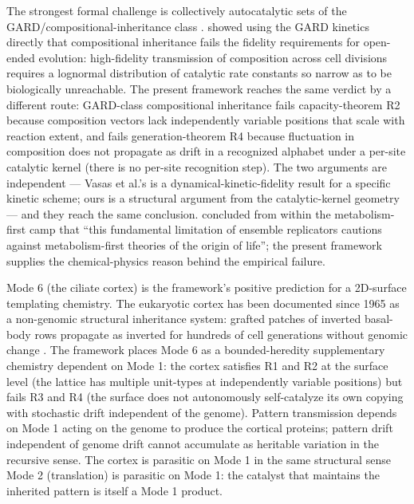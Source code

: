 \documentclass[aps,prx,reprint,amsmath,amssymb,floatfix,superscriptaddress,nofootinbib]{revtex4-2}
\theoremstyle{plain-thm}
\theoremstyle{definition-thm}
\begin{document}
The strongest formal challenge is collectively autocatalytic sets of the GARD/compositional-inheritance class \citep{Kauffman1986, Hordijk2012}. \citet{Vasas2010} showed using the GARD kinetics directly that compositional inheritance fails the fidelity requirements for open-ended evolution: high-fidelity transmission of composition across cell divisions requires a lognormal distribution of catalytic rate constants so narrow as to be biologically unreachable. The present framework reaches the same verdict by a different route: GARD-class compositional inheritance fails capacity-theorem R2 because composition vectors lack independently variable positions that scale with reaction extent, and fails generation-theorem R4 because fluctuation in composition does not propagate as drift in a recognized alphabet under a per-site catalytic kernel (there is no per-site recognition step). The two arguments are independent --- Vasas et al.'s is a dynamical-kinetic-fidelity result for a specific kinetic scheme; ours is a structural argument from the catalytic-kernel geometry --- and they reach the same conclusion. \citet{Vasas2010} concluded from within the metabolism-first camp that ``this fundamental limitation of ensemble replicators cautions against metabolism-first theories of the origin of life''; the present framework supplies the chemical-physics reason behind the empirical failure.

Mode 6 (the ciliate cortex) is the framework's positive prediction for a 2D-surface templating chemistry. The eukaryotic cortex has been documented since 1965 as a non-genomic structural inheritance system: grafted patches of inverted basal-body rows propagate as inverted for hundreds of cell generations without genomic change \citep{BeissonSonneborn1965, Frankel1989}. The framework places Mode 6 as a bounded-heredity supplementary chemistry dependent on Mode 1: the cortex satisfies R1 and R2 at the surface level (the lattice has multiple unit-types at independently variable positions) but fails R3 and R4 (the surface does not autonomously self-catalyze its own copying with stochastic drift independent of the genome). Pattern transmission depends on Mode 1 acting on the genome to produce the cortical proteins; pattern drift independent of genome drift cannot accumulate as heritable variation in the recursive sense. The cortex is parasitic on Mode 1 in the same structural sense Mode 2 (translation) is parasitic on Mode 1: the catalyst that maintains the inherited pattern is itself a Mode 1 product.
\end{document}
